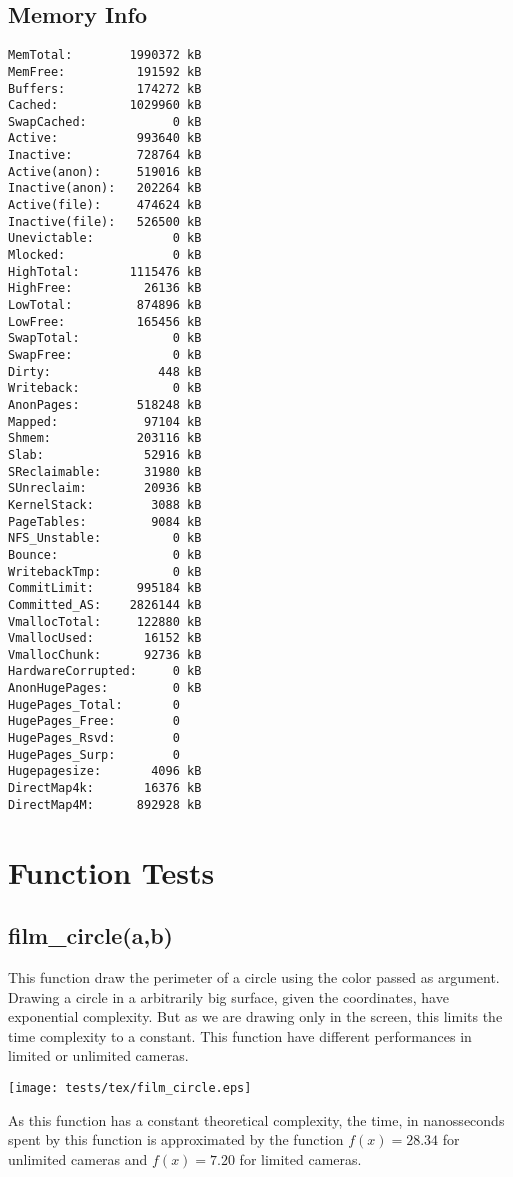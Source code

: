 \documentclass{article}
\begin{document}
\subsection{Memory Info}
\begin{verbatim}
MemTotal:        1990372 kB
MemFree:          191592 kB
Buffers:          174272 kB
Cached:          1029960 kB
SwapCached:            0 kB
Active:           993640 kB
Inactive:         728764 kB
Active(anon):     519016 kB
Inactive(anon):   202264 kB
Active(file):     474624 kB
Inactive(file):   526500 kB
Unevictable:           0 kB
Mlocked:               0 kB
HighTotal:       1115476 kB
HighFree:          26136 kB
LowTotal:         874896 kB
LowFree:          165456 kB
SwapTotal:             0 kB
SwapFree:              0 kB
Dirty:               448 kB
Writeback:             0 kB
AnonPages:        518248 kB
Mapped:            97104 kB
Shmem:            203116 kB
Slab:              52916 kB
SReclaimable:      31980 kB
SUnreclaim:        20936 kB
KernelStack:        3088 kB
PageTables:         9084 kB
NFS_Unstable:          0 kB
Bounce:                0 kB
WritebackTmp:          0 kB
CommitLimit:      995184 kB
Committed_AS:    2826144 kB
VmallocTotal:     122880 kB
VmallocUsed:       16152 kB
VmallocChunk:      92736 kB
HardwareCorrupted:     0 kB
AnonHugePages:         0 kB
HugePages_Total:       0
HugePages_Free:        0
HugePages_Rsvd:        0
HugePages_Surp:        0
Hugepagesize:       4096 kB
DirectMap4k:       16376 kB
DirectMap4M:      892928 kB
\end{verbatim}
\section{Function Tests}
\subsection{film\_circle(a,b)}
This function draw the perimeter of a circle using
the color passed as argument. Drawing a
circle in a arbitrarily big surface, given the
coordinates, have exponential complexity. But as
we are drawing only in the screen, this limits 
the time complexity to a constant. This function
have different performances in limited or unlimited
cameras.

\texttt{[image: tests/tex/film\_circle.eps]}

As this function has a constant
theoretical complexity, the time, in nanosseconds
spent by this function is 
approximated by the function $f(x)=28.34$
for unlimited cameras and $f(x)=7.20$ for
limited cameras.
\end{document}
